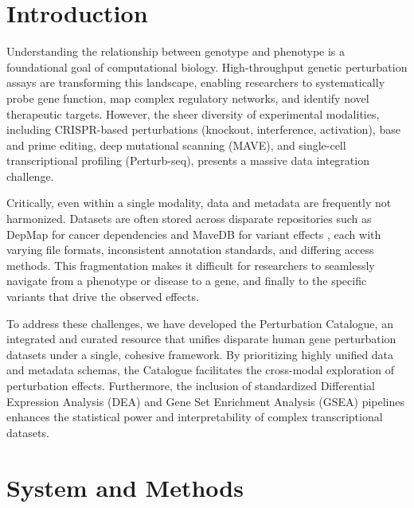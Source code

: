 \documentclass[unnumsec,webpdf,contemporary,large]{oup-authoring-template}
\begin{document}

\maketitle

\section{Introduction}
Understanding the relationship between genotype and phenotype is a foundational goal of computational biology. High-throughput genetic perturbation assays are transforming this landscape, enabling researchers to systematically probe gene function, map complex regulatory networks, and identify novel therapeutic targets. However, the sheer diversity of experimental modalities, including CRISPR-based perturbations (knockout, interference, activation), base and prime editing, deep mutational scanning (MAVE), and single-cell transcriptional profiling (Perturb-seq), presents a massive data integration challenge. 

Critically, even within a single modality, data and metadata are frequently not harmonized. Datasets are often stored across disparate repositories such as DepMap for cancer dependencies \citep{tsherniak2017defining} and MaveDB for variant effects \citep{rubin2025mavedb}, each with varying file formats, inconsistent annotation standards, and differing access methods. This fragmentation makes it difficult for researchers to seamlessly navigate from a phenotype or disease to a gene, and finally to the specific variants that drive the observed effects.

To address these challenges, we have developed the Perturbation Catalogue, an integrated and curated resource that unifies disparate human gene perturbation datasets under a single, cohesive framework. By prioritizing highly unified data and metadata schemas, the Catalogue facilitates the cross-modal exploration of perturbation effects. Furthermore, the inclusion of standardized Differential Expression Analysis (DEA) and Gene Set Enrichment Analysis (GSEA) pipelines enhances the statistical power and interpretability of complex transcriptional datasets. 

\section{System and Methods}
\end{document}
